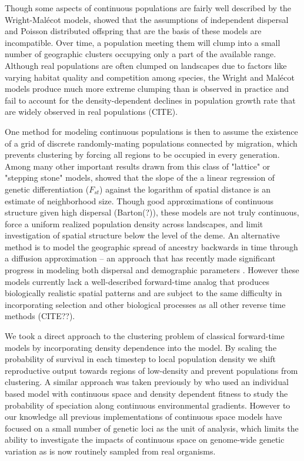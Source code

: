\documentclass[9pt,twocolumn,twoside,lineno]{gsajnl}
\newif\ifcomments
\newcommand{\ak}[1]{\ifcomments{{\color{red} \it (#1)}}\else{}\fi}
\begin{document}
Though some aspects of continuous populations are fairly well described by the Wright-Malécot models, \cite{Felsenstein1975} showed that the assumptions of independent dispersal and Poisson distributed offspring that are the basis of these models are incompatible. Over time, a population meeting them will clump into a small number of geographic clusters occupying only a part of the available range. Although real populations are often clumped on landscapes due to factors like varying habitat quality and competition among species, the Wright and Malécot models produce much more extreme clumping than is observed in practice and fail to account for the density-dependent declines in population growth rate that are widely observed in real populations (CITE). 

One method for modeling continuous populations is then to assume the existence of a grid of discrete randomly-mating populations connected by migration, which prevents clustering by forcing all regions to be occupied in every generation. Among many other important results drawn from this class of "lattice" or "stepping stone" models, \cite{Rousset1997} showed that the slope of the a linear regression of genetic differentiation ($F_{st}$) against the logarithm of spatial distance is an estimate of neighborhood size. Though good approximations of continuous structure given high dispersal (Barton(?)), these models are not truly continuous, force a uniform realized population density across landscapes, and limit investigation of spatial structure below the level of the deme. An alternative method is to model the geographic spread of ancestry backwards in time through a diffusion approximation -- an approach that has recently made significant progress in modeling both dispersal and demographic parameters \citep{Barton2010,Kelleher2014,Ringbauer2017,Ringbauer2018}. However these models currently lack a well-described forward-time analog that produces biologically realistic spatial patterns and are subject to the same difficulty in incorporating selection and other biological processes as all other reverse time methods (CITE??).

\ak{Andy-- I think we could move some of the text from the following paragraph to methods}
We took a direct approach to the clustering problem of classical forward-time models by incorporating density dependence into the model. By scaling the probability of survival in each timestep to local population density we shift reproductive output towards regions of low-density and prevent populations from clustering. A similar approach was taken previously by \citep{Doebeli2003} who used an individual based model with continuous space and density dependent fitness to study the probability of speciation along continuous environmental gradients. However to our knowledge all previous implementations of continuous space models have focused on a small number of genetic loci as the unit of analysis, which limits the ability to investigate the impacts of continuous space on genome-wide genetic variation as is now routinely sampled from real organisms. 
\end{document}
